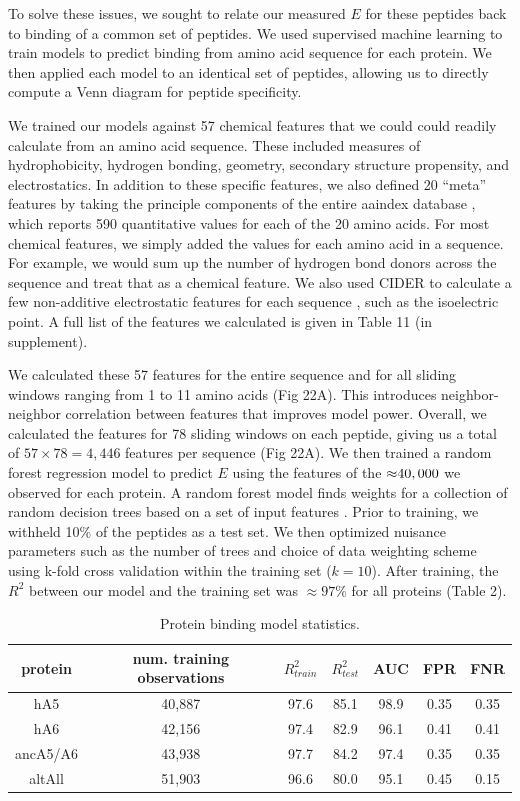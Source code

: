 To solve these issues, we sought to relate our measured $E$ for these
peptides back to binding of a common set of peptides. We used supervised
machine learning to train models to predict binding from amino acid
sequence for each protein. We then applied each model to an identical
set of peptides, allowing us to directly compute a Venn diagram for
peptide specificity. 

We trained our models against 57 chemical features that we could could
readily calculate from an amino acid sequence. These included measures
of hydrophobicity, hydrogen bonding, geometry, secondary structure
propensity, and electrostatics. In addition to these specific features,
we also defined 20 ``meta'' features by taking the principle components
of the entire aaindex database \citep{kawashima_aaindex:_2008}, which
reports 590 quantitative values for each of the 20 amino acids. For
most chemical features, we simply added the values for each amino
acid in a sequence. For example, we would sum up the number of hydrogen
bond donors across the sequence and treat that as a chemical feature.
We also used CIDER to calculate a few non-additive electrostatic features
for each sequence \citep{holehouse_cider:_2015}, such as the isoelectric
point. A full list of the features we calculated is given in Table 11 (in supplement). 

We calculated these 57 features for the entire sequence and for all
sliding windows ranging from 1 to 11 amino acids (Fig 22A). This introduces
neighbor-neighbor correlation between features that improves model
power. Overall, we calculated the features for 78 sliding windows
on each peptide, giving us a total of $57\times78=4,446$ features
per sequence (Fig 22A). We then trained a random forest regression
model to predict $E$ using the features of the $\text{\ensuremath{\approx}}40,000$
we observed for each protein. A random forest model finds weights
for a collection of random decision trees based on a set of input
features \citep{breiman_random_2001}. Prior to training, we withheld
10\% of the peptides as a test set. We then optimized nuisance parameters
such as the number of trees and choice of data weighting scheme using
k-fold cross validation within the training set ($k=10$). After training,
the $R^{2}$ between our model and the training set was $\approx97\%$
for all proteins (Table 2). 

\begin{table}[h!]\footnotesize
\center
\scriptsize
\caption[Protein binding model statistics] {Protein binding model statistics.}
\scriptsize
\begin{tabular}{c|c|ccc|cc}
protein & num. training observations & $R_{train}^{2}$ & $R_{test}^{2}$ & AUC & FPR & FNR\tabularnewline
\hline 
hA5 & 40,887 & 97.6 & 85.1 & 98.9 & 0.35 & 0.35\tabularnewline
hA6 & 42,156 & 97.4 & 82.9 & 96.1 & 0.41 & 0.41\tabularnewline
ancA5/A6 & 43,938 & 97.7 & 84.2 & 97.4 & 0.35 & 0.35\tabularnewline
altAll & 51,903 & 96.6 & 80.0 & 95.1 & 0.45 & 0.15\tabularnewline
\end{tabular}
\end{table}

